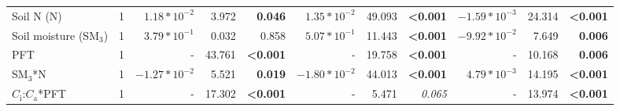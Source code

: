 \begin{landscape}
\begin{table}
{\begin{tabular}{p{3.75cm}p{0.5cm}p{1.75cm}p{1.5cm}p{1.5cm}p{1.75cm}p{1.5cm}p{1.5cm}p{1.75cm}p{1.5cm}p{1.5cm}}
            Soil N (N) & \multicolumn{1}{r}{1}
            & \multicolumn{1}{r}{$1.18*10^{-2}$}    & \multicolumn{1}{r}{3.972}         & \multicolumn{1}{r}{\textbf{0.046}}
            & \multicolumn{1}{r}{$1.35*10^{-2}$}    & \multicolumn{1}{r}{49.093}        & \multicolumn{1}{r}{\textbf{<0.001}}
            & \multicolumn{1}{r}{$-1.59*10^{-3}$}   & \multicolumn{1}{r}{24.314}        & \multicolumn{1}{r}{\textbf{<0.001}} 
            \\ %

            Soil moisture (SM$_{3}$) & \multicolumn{1}{r}{1}
            & \multicolumn{1}{r}{$3.79*10^{-1}$}      & \multicolumn{1}{r}{0.032}         & \multicolumn{1}{r}{0.858}
            & \multicolumn{1}{r}{$5.07*10^{-1}$}      & \multicolumn{1}{r}{11.443}        & \multicolumn{1}{r}{\textbf{<0.001}}
            & \multicolumn{1}{r}{$-9.92*10^{-2}$}     & \multicolumn{1}{r}{7.649}         & \multicolumn{1}{r}{\textbf{0.006}} 
            \\ %

            PFT & \multicolumn{1}{r}{1}
            & \multicolumn{1}{r}{-}             & \multicolumn{1}{r}{43.761}        & \multicolumn{1}{r}{\textbf{<0.001}}
            & \multicolumn{1}{r}{-}             & \multicolumn{1}{r}{19.758}        & \multicolumn{1}{r}{\textbf{<0.001}}
            & \multicolumn{1}{r}{-}             & \multicolumn{1}{r}{10.168}         & \multicolumn{1}{r}{\textbf{0.006}} 
            \\ %

            SM$_{3}$*N & \multicolumn{1}{r}{1}
            & \multicolumn{1}{r}{$-1.27*10^{-2}$}     & \multicolumn{1}{r}{5.521}         & \multicolumn{1}{r}{\textbf{0.019}}
            & \multicolumn{1}{r}{$-1.80*10^{-2}$}     & \multicolumn{1}{r}{44.013}        & \multicolumn{1}{r}{\textbf{<0.001}}
            & \multicolumn{1}{r}{$4.79*10^{-3}$}      & \multicolumn{1}{r}{14.195}        & \multicolumn{1}{r}{\textbf{<0.001}} 
            \\ %

            $C_\mathrm{i}$:$C_\mathrm{a}$*PFT & \multicolumn{1}{r}{1}
            & \multicolumn{1}{r}{-}             & \multicolumn{1}{r}{17.302}        & \multicolumn{1}{r}{\textbf{<0.001}}
            & \multicolumn{1}{r}{-}             & \multicolumn{1}{r}{5.471}         & \multicolumn{1}{r}{\textit{ 0.065}}
            & \multicolumn{1}{r}{-}             & \multicolumn{1}{r}{13.974}        & \multicolumn{1}{r}{\textbf{<0.001}} 
            \\ %


\end{tabular}}
\end{table}
\end{landscape}
